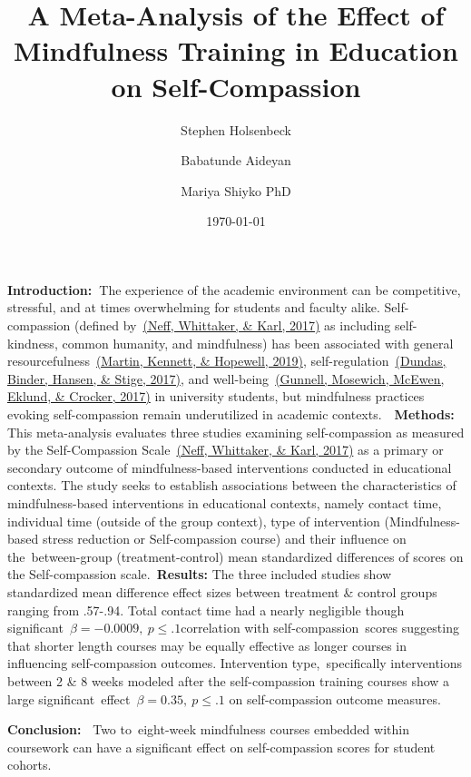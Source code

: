 \documentclass[10pt]{article}
\renewenvironment{abstract}
  {{\bfseries\noindent{\abstractname}\par\nobreak}\footnotesize}
  {\bigskip}
\begin{document}
\title{
\centering
A Meta-Analysis of the Effect of Mindfulness Training in Education on Self-Compassion}


\author[1]{Stephen Holsenbeck}%
%
\author[1]{Babatunde Aideyan}%
\author[1]{Mariya Shiyko PhD}%


\vspace{-1em}



  \date{\today}


\begingroup
\let\center\flushleft
\let\endcenter\endflushleft
\maketitle
\endgroup




\colorbox{teal!10}{%
\begin{minipage}{1\linewidth}%
\begin{abstract}
\textbf{Introduction:~}The experience of the academic environment can be
competitive, stressful, and at times overwhelming for students and
faculty alike. Self-compassion (defined by~\hyperref[csl:1]{(Neff, Whittaker, \& Karl, 2017)} as
including self-kindness, common humanity, and mindfulness) has been
associated with general resourcefulness~\hyperref[csl:2]{(Martin, Kennett, \& Hopewell, 2019)},
self-regulation~\hyperref[csl:3]{(Dundas, Binder, Hansen, \& Stige, 2017)}, and well-being~\hyperref[csl:4]{(Gunnell, Mosewich, McEwen, Eklund, \& Crocker, 2017)} in
university students, but mindfulness practices evoking self-compassion
remain underutilized in academic contexts.~~\textbf{Methods:} This
meta-analysis evaluates three studies examining self-compassion as
measured by the Self-Compassion Scale~\hyperref[csl:1]{(Neff, Whittaker, \& Karl, 2017)} as a primary or
secondary outcome of mindfulness-based interventions conducted in
educational contexts. The study seeks to establish associations between
the characteristics of mindfulness-based interventions in educational
contexts, namely contact time, individual time (outside of the group
context), type of intervention (Mindfulness-based stress reduction or
Self-compassion course) and their influence on the~between-group
(treatment-control) mean standardized differences of scores on the
Self-compassion scale.~\textbf{Results:} The three included studies show
standardized mean difference effect sizes between treatment \& control
groups ranging from .57-.94. Total contact time had a nearly negligible
though significant~\(\beta=-0.0009,\ p\le.1\)correlation with
self-compassion~scores suggesting that shorter length courses may be
equally effective as longer courses in influencing self-compassion
outcomes. Intervention type,~specifically interventions between 2 \& 8
weeks modeled after the self-compassion training courses show a large
significant~effect~\(\beta = 0.35,\ p\leq.1\) on self-compassion outcome
measures.

\textbf{Conclusion:~} Two to~eight-week mindfulness courses embedded
within coursework can have a significant effect on self-compassion
scores for student cohorts.%
\end{abstract}%
\end{minipage}%
}
\end{document}
